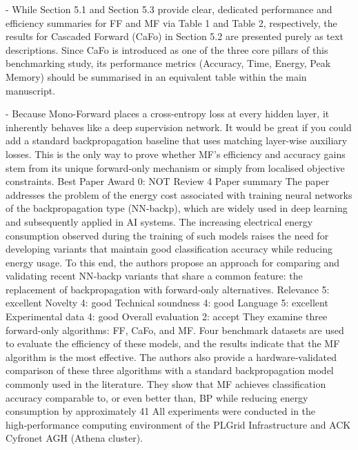 - While Section 5.1 and Section 5.3 provide clear, dedicated performance and efficiency summaries for FF and MF via Table 1 and Table 2, respectively, the results for Cascaded Forward (CaFo) in Section 5.2 are presented purely as text descriptions. Since CaFo is introduced as one of the three core pillars of this benchmarking study, its performance metrics (Accuracy, Time, Energy, Peak Memory) should be summarised in an equivalent table within the main manuscript.

- Because Mono-Forward places a cross-entropy loss at every hidden layer, it inherently behaves like a deep supervision network. It would be great if you could add a standard backpropagation baseline that uses matching layer-wise auxiliary losses. This is the only way to prove whether MF's efficiency and accuracy gains stem from its unique forward-only mechanism or simply from localised objective constraints.
Best Paper Award	
0: NOT
Review 4
Paper summary	The paper addresses the problem of the energy cost associated with training neural networks of the backpropagation type (NN‑backp),
which are widely used in deep learning and subsequently applied in AI systems. The increasing electrical energy consumption observed
during the training of such models raises the need for developing variants that maintain good classification accuracy while reducing energy usage.
To this end, the authors propose an approach for comparing and validating recent NN‑backp variants that share a common feature:
the replacement of backpropagation with forward‑only alternatives.
Relevance	
5: excellent
Novelty	
4: good
Technical soundness	
4: good
Language	
5: excellent
Experimental data	
4: good
Overall evaluation	
2: accept
They examine three forward-only algorithms: FF, CaFo, and MF.
Four benchmark datasets are used to evaluate the efficiency of these models, and the results indicate that the MF algorithm
is the most effective. The authors also provide a hardware‑validated comparison of these three algorithms with a standard backpropagation
model commonly used in the literature. They show that MF achieves classification accuracy comparable to, or even better than, BP while
reducing energy consumption by approximately 41%
All experiments were conducted in the high‑performance computing environment of the PLGrid Infrastructure and ACK Cyfronet AGH (Athena cluster).

